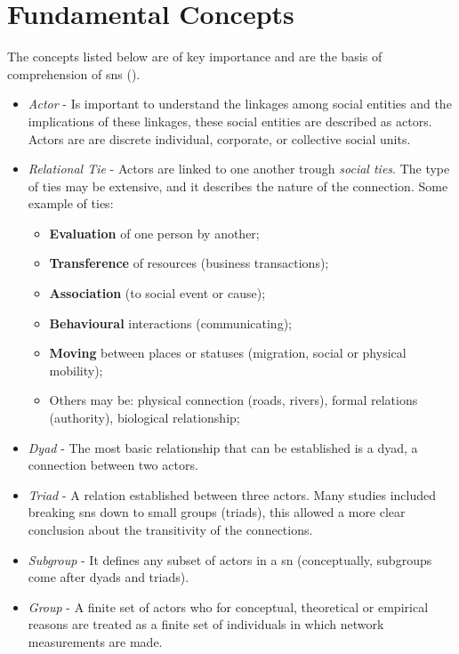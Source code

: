 \section{Fundamental Concepts}

The concepts listed below are of key importance and are the basis of comprehension of \glspl{sn} (\cite{wasserman1994social}).

\begin{itemize}
    \item \emph{Actor} - Is important to understand the linkages among social entities and the implications of these linkages, these social entities are described as actors. Actors are are discrete individual, corporate, or collective social units.
    \item \emph{Relational Tie} - Actors are linked to one another trough \textit{social ties}. The type of ties may be extensive, and it describes the nature of the connection. Some example of ties:
        \begin{itemize}
            \item \textbf{Evaluation} of one person by another;
            \item \textbf{Transference} of resources (business transactions);
            \item \textbf{Association} (to social event or cause);
            \item \textbf{Behavioural} interactions (communicating);
            \item \textbf{Moving} between places or statuses (migration, social or physical mobility);
            \item Others may be: physical connection (roads, rivers), formal relations (authority), biological relationship;
        \end{itemize}
    \item \emph{Dyad} - The most basic relationship that can be established is a dyad, a connection between two actors.
    \item \emph{Triad} - A relation established between three actors. Many studies included breaking \glspl{sn} down to small groups (triads), this allowed a more clear conclusion about the transitivity of the connections.
    \item \emph{Subgroup} - It defines any subset of actors in a \gls{sn} (conceptually, subgroups come after dyads and triads).
    \item \emph{Group} - A finite set of actors who for conceptual, theoretical or empirical reasons are treated as a finite set of individuals in which network measurements are made.

\end{itemize}
